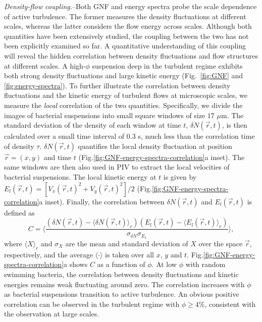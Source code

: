 \documentclass[twocolumn,aps,prl,amsmath,amssymb,longbibliography]{revtex4-2}
\begin{document}
\textit{Density-flow coupling.}--Both GNF and energy spectra probe the scale dependence of active turbulence. The former measures the density fluctuations at different scales, whereas the latter considers the flow energy across scales. Although both quantities have been extensively studied, the coupling between the two has not been explicitly examined so far. A quantitative understanding of this coupling will reveal the hidden correlation between density fluctuations and flow structures at different scales.
A high-$\phi$ suspension deep in the turbulent regime exhibits both strong density fluctuations and large kinetic energy (Fig.~\ref{fig:GNF} and \ref{fig:energy-spectra}). To further illustrate the correlation between density fluctuations and the kinetic energy of turbulent flows at microscopic scales, we measure the \emph{local} correlation of the two quantities. Specifically, we divide the images of bacterial suspensions into small square windows of size $17$ $\mu$m. The standard deviation of the density of each window at time $t$, $\delta N(\vec{r},t)$, is then calculated over a small time interval of $0.3$ s, much less than the correlation time of density $\tau$.
$\delta N(\vec{r},t)$ quantifies the local density fluctuation at position $\vec{r} = (x,y)$ and time $t$ (Fig.\ref{fig:GNF-energy-spectra-correlation}a inset).
The same windows are then also used in PIV to extract the local velocities of bacterial suspensions. The local kinetic energy at $t$ is given by $E_l(\vec{r},t) = \left[ V_x(\vec{r},t)^2 + V_y(\vec{r},t)^2 \right]/2$ (Fig.\ref{fig:GNF-energy-spectra-correlation}a inset). Finally, the correlation between $\delta N(\vec{r},t)$ and $E_l(\vec{r},t)$ is defined as
\begin{equation}
C = \bigg \langle \frac{ (\delta N(\vec{r},t) - \langle \delta N(\vec{r},t) \rangle_r)(E_l(\vec{r},t) - \langle E_l(\vec{r},t) \rangle_r)}{\sigma_{\delta N}\sigma_{E_1}} \bigg \rangle,
\end{equation}
where $\langle X \rangle_r$ and $\sigma_X$ are the mean and standard deviation of $X$ over the space $\vec{r}$, respectively, and the average $\langle\cdot\rangle$ is taken over all $x$, $y$ and $t$.
Fig.\ref{fig:GNF-energy-spectra-correlation}a shows $C$ as a function of $\phi$. At low $\phi$ with random swimming bacteria, the correlation between density fluctuations and kinetic energies remains weak fluctuating around zero. The correlation increases with $\phi$ as bacterial suspensions transition to active turbulence. An obvious positive correlation can be observed in the turbulent regime with $\phi \ge 4\%$, consistent with the observation at large scales.
\end{document}
